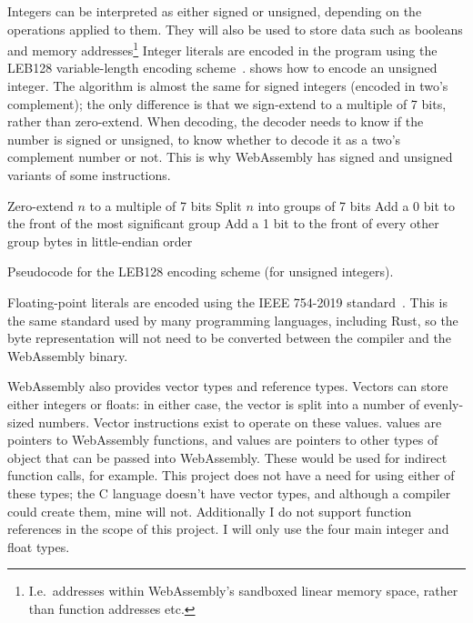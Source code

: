 \documentclass[00-main.tex]{subfiles}
\begin{document}
Integers can be interpreted as either signed or unsigned, depending on the operations applied to them.
They will also be used to store data such as booleans and memory addresses\footnote{I.e.\ addresses within WebAssembly's sandboxed linear memory space, rather than function addresses etc.}
Integer literals are encoded in the program using the LEB128 variable-length encoding scheme~.
 shows how to encode an unsigned integer.
The algorithm is almost the same for signed integers (encoded in two's complement); the only difference is that we sign-extend to a multiple of 7 bits, rather than zero-extend.
When decoding, the decoder needs to know if the number is signed or unsigned, to know whether to decode it as a two's complement number or not.
This is why WebAssembly has signed and unsigned variants of some instructions.

\begin{listing}[t]
  \begin{PseudocodeListing}
      \State Zero-extend $n$ to a multiple of 7 bits
      \State Split $n$ into groups of 7 bits
      \State Add a 0 bit to the front of the most significant group
      \State Add a 1 bit to the front of every other group
      \State \Return bytes in little-endian order
    \EndFunction
  \end{PseudocodeListing}
  \caption{Pseudocode for the LEB128 encoding scheme (for unsigned integers).}
  \label{lst:leb128 pseudocode}
\end{listing}

Floating-point literals are encoded using the IEEE 754-2019 standard~. %
This is the same standard used by many programming languages, including Rust, so the byte representation will not need to be converted between the compiler and the WebAssembly binary.

WebAssembly also provides vector types and reference types.
Vectors can store either integers or floats: in either case, the vector is split into a number of evenly-sized numbers.
Vector instructions exist to operate on these values.
 values are pointers to WebAssembly functions, and  values are pointers to other types of object that can be passed into WebAssembly. These would be used for indirect function calls, for example.
This project does not have a need for using either of these types; the C language doesn't have vector types, and although a compiler could create them, mine will not.
Additionally I do not support function references in the scope of this project.
I will only use the four main integer and float types.
\end{document}
